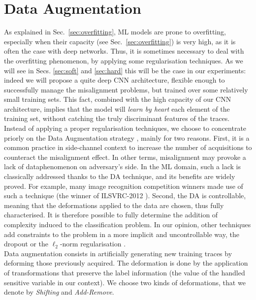 \section{Data Augmentation}\label{sec:DA}
As explained in Sec.~\ref{sec:overfitting}, ML models are prone to overfitting, especially when their capacity (see Sec.~\ref{sec:overfitting}) is very high, as it is often the case with deep networks. Thus, it is sometimes necessary to deal with the overfitting phenomenon, by applying some regularisation techniques. As we will see in Secs. \ref{sec:soft} and \ref{sec:hard} this will be the case in our experiments: indeed we will propose a quite deep CNN architecture,  flexible enough to successfully manage the misalignment problems, but trained over some relatively small training sets. This fact, combined with the high capacity of our CNN architecture, implies that the model will \emph{learn by heart} each element of the training set, without catching the truly discriminant features of the traces.\\

Instead of applying a proper regularisation techniques, we choose to concentrate priorly on the Data Augmentation strategy \cite{simard2003best}, mainly for two reasons. First, it is a common practice in side-channel context to increase the number of acquisitions to counteract the misalignment effect. In other terms, misalignment may provoke a \textquotedbl lack of data\textquotedbl phenomenon on adversary's side. In the ML domain, such a lack is classically addressed thanks to the DA technique, and its benefits are widely proved. For example, many image recognition competition winners made use of such a technique (\eg the winner of ILSVRC-2012 \cite{KSH12}). Second, the DA is controllable, meaning that the deformations applied to the data are chosen, thus fully characterised. It is therefore possible to fully determine the addition of complexity induced to the classification problem. In our opinion, other techniques add constraints to the problem in a more implicit and uncontrollable way, \eg the dropout \cite{HSKSS12}  or the $\ell_2$-norm regularisation \cite{christopher2006pattern}.\\

Data augmentation consists in artificially generating new training traces by deforming those previously acquired. The deformation is done by the application of transformations that preserve the  label information (\ie the value of the handled sensitive variable in our context). We choose two kinds of deformations, that we denote by \emph{Shifting} and \emph{Add-Remove}. 

